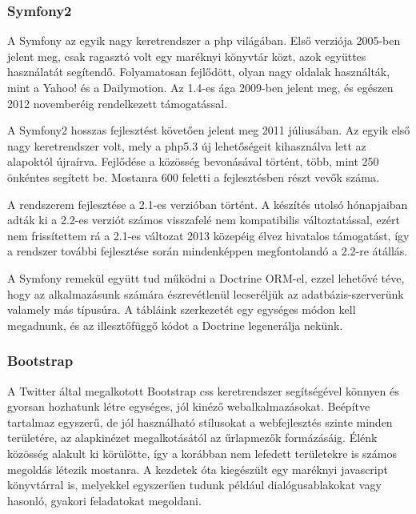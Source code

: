 \documentclass[a4paper,12pt,oneside]{report}
\begin{document}
\subsubsection{Symfony2}

A Symfony az egyik nagy keretrendszer a php világában. Első verziója 2005-ben jelent meg\cite{book:gentle_introduction}, csak ragasztó volt egy maréknyi könyvtár közt, azok együttes használatát segítendő. Folyamatosan fejlődött, olyan nagy oldalak hasz\-nálták, mint a Yahoo!\cite{website:symfony_yahoo} és a Dailymotion\cite{website:symfony_dailymotion}. Az 1.4-es ága 2009-ben jelent meg, és egészen 2012 novemberéig rendelkezett támogatással.

A Symfony2 hosszas fejlesztést követően jelent meg 2011 júliusában. Az egyik első nagy keretrendszer volt, mely a php5.3 új lehetőségeit kihasználva lett az alapoktól újraírva. Fejlődése a közösség bevonásával történt, több, mint 250 önkéntes segített be. Mostanra 600 feletti a fejlesztésben részt vevők száma.

A rendszerem fejlesztése a 2.1-es verzióban történt. A készítés utolsó hónapjaiban adták ki a 2.2-es verziót számos visszafelé nem kompatibilis változtatással, ezért nem frissítettem rá \textendash{} a 2.1-es változat 2013 közepéig élvez hivatalos támogatást, így a rendszer további fejlesztése során mindenképpen megfontolandó a 2.2-re átállás.

A Symfony remekül együtt tud működni a Doctrine ORM-el\cite{website:doctrine}\cite{book:doctrine_orm}, ezzel lehetővé téve, hogy az alkalmazásunk számára észrevétlenül lecseréljük az adatbázis-szerverünk valamely más típusúra. A tábláink szerkezetét egy egységes módon kell megadnunk, és az illesztőfüggő kódot a Doctrine legenerálja nekünk.

\subsubsection{Bootstrap}

A Twitter által megalkotott Bootstrap\cite{website:bootstrap} css keretrendszer segítségével könnyen és gyorsan hozhatunk létre egységes, jól kinéző webalkalmazásokat. Beépítve tartalmaz egyszerű, de jól használható stílusokat a webfejlesztés szinte minden területére, az alapkinézet megalkotásától az űrlapmezők formázásáig. Élénk közösség alakult ki körülötte, így a korábban nem lefedett területekre is számos megoldás létezik mostanra. A kezdetek óta kiegészült egy maréknyi javascript könyvtárral is, melyekkel egyszerűen tudunk például dialógusablakokat vagy hasonló, gyakori feladatokat megoldani.
\end{document}
